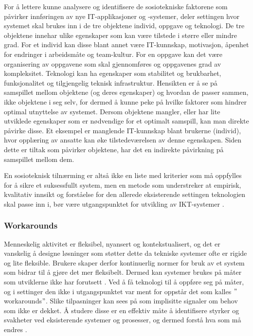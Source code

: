 \noindent
For å lettere kunne analysere og identifisere de sosiotekniske faktorene som påvirker innføringen av nye IT-applikasjoner og -systemer, deler \citet{FITT} settingen hvor systemet skal brukes inn i de tre objektene individ, oppgave og teknologi. De tre objektene innehar ulike egenskaper som kan være tilstede i større eller mindre grad. For et individ kan disse blant annet være IT-kunnskap, motivasjon, åpenhet for endringer i arbeidsmåte og team-kultur. For en oppgave kan det være organisering av oppgavene som skal gjennomføres og oppgavenes grad av kompleksitet. Teknologi kan ha egenskaper som stabilitet og brukbarhet, funksjonalitet og tilgjengelig teknisk infrastruktur. Hensikten er å se på samspillet mellom objektene (og deres egenskaper) og hvordan de passer sammen, ikke objektene i seg selv, for dermed å kunne peke på hvilke faktorer som hindrer optimal utnyttelse av systemet. Dersom objektene mangler, eller har lite utviklede egenskaper som er nødvendige for et optimalt samspill, kan man direkte påvirke disse. Et eksempel er manglende IT-kunnskap blant brukerne (individ), hvor opplæring av ansatte kan øke tilstedeværelsen av denne egenskapen. Siden dette er tiltak som påvirker objektene, har det en indirekte påvirkning på samspillet mellom dem. 

\noindent
En sosioteknisk tilnærming er altså ikke en liste med kriterier som må oppfylles for å sikre et suksessfullt system, men en metode som understreker at empirisk, kvalitativ innsikt og forståelse for den allerede eksisterende settingen teknologien skal passe inn i, bør være utgangspunktet for utvikling av IKT-systemer \citep{Berg99}. 

\subsubsection{Workarounds}
\label{sec:workarounds}
Menneskelig aktivitet er fleksibel, nyansert og kontekstualisert, og det er vanskelig å designe løsninger som støtter dette da tekniske systemer ofte er rigide og lite fleksible. Brukere skaper derfor kontinuerlig normer for bruk av et system som bidrar til å gjøre det mer fleksibelt. Dermed kan systemer brukes på måter som utviklerne ikke har forutsett \citep{Ackerman00}. Ved å få teknologi til å oppføre seg på måter, og i settinger den ikke i utgangspunktet var ment for oppstår det som kalles $"$workarounds$"$. Slike tilpasninger kan sees på som implisitte signaler om behov som ikke er dekket. Å studere disse er en effektiv måte å identifisere styrker og svakheter ved eksisterende systemer og prosesser, og dermed forstå hva som må endres \citep{Coiera07}. 

